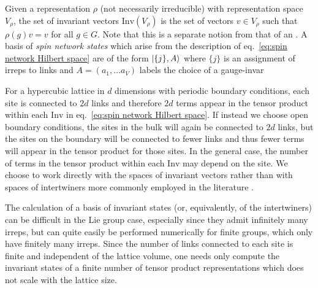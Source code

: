 \begin{figure}[t]
\end{figure}

Given a representation $\rho$ (not necessarily irreducible) with representation space $V_\rho$, the set of invariant vectors $\mathrm{Inv}(V_\rho)$ is the set of vectors $v \in V_\rho$ such that $\rho(g) v = v$ for all $g\in G$.
Note that this is a separate notion from that of an .
A basis of \textit{spin network states} which arise from the description of eq.~\eqref{eq:spin network Hilbert space} are of the form $\ket{\{j\},A}$ where $\{j\}$ is an assignment of irreps to links and $A=(a_1, \ldots a_V)$ labels the choice of a gauge-invar


For a hypercubic lattice in $d$ dimensions with periodic boundary conditions, each site is connected to $2d$ links and therefore $2d$ terms appear in the tensor product within each $\mathrm{Inv}$ in eq.~\eqref{eq:spin network Hilbert space}.
If instead we choose open boundary conditions, the sites in the bulk will again be connected to $2d$ links, but the sites on the boundary will be connected to fewer links and thus fewer terms will appear in the tensor product for those sites.
In the general case, the number of terms in the tensor product within each $\mathrm{Inv}$ may depend on the site.
We choose to work directly with the spaces of invariant vectors rather than with spaces of intertwiners more commonly employed in the literature \cite{Baez, Burgio}.

The calculation of a basis of invariant states (or, equivalently, of the intertwiners) can be difficult in the Lie group case, especially since they admit infinitely many irreps, but can quite easily be performed numerically for finite groups, which only have finitely many irreps.
Since the number of links connected to each site is finite and independent of the lattice volume, one needs only compute the invariant states of a finite number of tensor product representations which does not scale with the lattice size.

